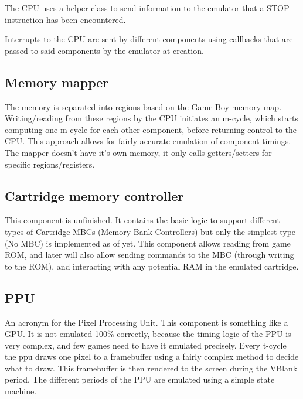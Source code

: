 \documentclass{article}
\begin{document}
            The CPU uses a helper class to send information to the emulator that a
            STOP instruction has been encountered.

            Interrupts to the CPU are sent by different components using
            callbacks that are passed to said components by the emulator at
            creation.

        \subsection{Memory mapper}
            The memory is separated into regions based on the Game Boy memory map.
            Writing/reading from these regions by the CPU initiates an m-cycle,
            which starts computing one m-cycle for each other component, before
            returning control to the CPU. This approach allows for fairly accurate
            emulation of component timings. The mapper doesn't have it's own
            memory, it only calls getters/setters for specific regions/registers.

        \subsection{Cartridge memory controller}
            This component is unfinished. It contains the basic logic to support
            different types of Cartridge MBCs (Memory Bank Controllers) but only
            the simplest type (No MBC) is implemented as of yet. This component
            allows reading from game ROM, and later will also allow sending commands
            to the MBC (through writing to the ROM), and interacting with any
            potential RAM in the emulated cartridge.

        \subsection{PPU}
            An acronym for the Pixel Processing Unit. This component is
            something like a GPU. It is not emulated 100\% correctly, because
            the timing logic of the PPU is very complex, and few games need to
            have it emulated precisely. Every t-cycle the ppu draws one pixel
            to a framebuffer using a fairly complex method to decide what to
            draw. This framebuffer is then rendered to the screen during the
            VBlank period. The different periods of the PPU are emulated using
            a simple state machine.
\end{document}
